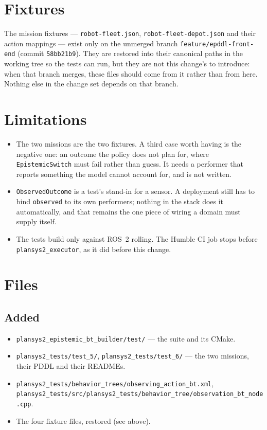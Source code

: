 \documentclass[11pt,a4paper]{article}
\newcommand{\code}[1]{\texttt{\small #1}}
\begin{document}
\section{Fixtures}

The mission fixtures --- \code{robot-fleet.json},
\code{robot-fleet-depot.json} and their action mappings --- exist only on the
unmerged branch \code{feature/epddl-front-end} (commit \code{58bb21b9}). They
are restored into their canonical paths in the working tree so the tests can
run, but they are not this change's to introduce: when that branch merges, these
files should come from it rather than from here. Nothing else in the change set
depends on that branch.

\section{Limitations}

\begin{itemize}
  \item The two missions are the two fixtures. A third case worth having is the
    negative one: an outcome the policy does not plan for, where
    \code{EpistemicSwitch} must fail rather than guess. It needs a performer
    that reports something the model cannot account for, and is not written.
  \item \code{ObservedOutcome} is a test's stand-in for a sensor. A deployment
    still has to bind \code{observed} to its own performers; nothing in the
    stack does it automatically, and that remains the one piece of wiring a
    domain must supply itself.
  \item The tests build only against ROS~2 rolling. The Humble CI job stops
    before \code{plansys2\_executor}, as it did before this change.
\end{itemize}

\section{Files}

\subsection*{Added}
\begin{itemize}
  \item \code{plansys2\_epistemic\_bt\_builder/test/} --- the suite and its CMake.
  \item \code{plansys2\_tests/test\_5/}, \code{plansys2\_tests/test\_6/} --- the
    two missions, their PDDL and their READMEs.
  \item \code{plansys2\_tests/behavior\_trees/observing\_action\_bt.xml},
    \code{plansys2\_tests/src/plansys2\_tests/behavior\_tree/observation\_bt\_node.cpp}.
  \item The four fixture files, restored (see above).
\end{itemize}
\end{document}
